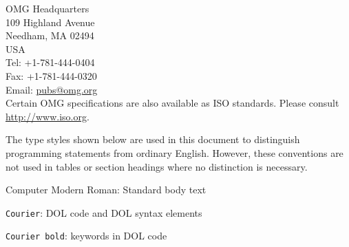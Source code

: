 \documentclass[10pt, a4paper]{isov2}
\begin{document}
\medskip
\noindent 
OMG Headquarters \\
109 Highland Avenue \\
Needham, MA 02494 \\
USA\\
Tel: +1-781-444-0404\\
Fax: +1-781-444-0320\\
Email: \url{pubs@omg.org}\\

\noindent Certain OMG specifications are also available as ISO standards. Please consult \url{http://www.iso.org}.




The type styles shown below are used in this document to distinguish
 programming statements from ordinary English. However, these conventions are
 not used in tables or section headings where no distinction is necessary.


\medskip \noindent
Computer Modern Roman: Standard body text

\lstinline{Courier}: DOL code and DOL syntax elements

\lstinline[keywordstyle=\color{black}\bfseries, keywords={Courier, bold}]{Courier bold}: keywords in DOL code



%
%
%
%

\end{document}
